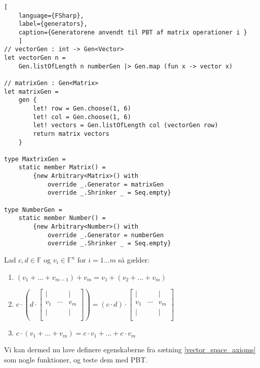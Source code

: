 \begin{lstlisting}[
    language={FSharp}, 
    label={generators}, 
    caption={Generatorene anvendt til PBT af matrix operationer i }
    ]
// vectorGen : int -> Gen<Vector>
let vectorGen n =
    Gen.listOfLength n numberGen |> Gen.map (fun x -> vector x)

// matrixGen : Gen<Matrix>
let matrixGen =
    gen {
        let! row = Gen.choose(1, 6)
        let! col = Gen.choose(1, 6)
        let! vectors = Gen.listOfLength col (vectorGen row)
        return matrix vectors
    }

type MaxtrixGen =
    static member Matrix() =
        {new Arbitrary<Matrix>() with
            override _.Generator = matrixGen
            override _.Shrinker _ = Seq.empty}

type NumberGen =
    static member Number() =
        {new Arbitrary<Number>() with
            override _.Generator = numberGen
            override _.Shrinker _ = Seq.empty}   
\end{lstlisting}
\begin{theorem}\label{vector_space_axioms}
    Lad $c, d \in \mathbb{F}$ og $v_i \in \mathbb{F}^n$ for $i = 1 \dots m$ så gælder:
    \begin{enumerate}
        \item $(v_1 + \dots + v_{m-1}) + v_m = v_1 + (v_2 + \dots + v_m)$
        \item $c \cdot \left(d \cdot \begin{bmatrix}
            | &        & | \\
            v_{1} & \cdots & v_{m} \\
            | &        & | \\
        \end{bmatrix}\right) = (c \cdot d) \cdot \begin{bmatrix}
            | &        & | \\
            v_{1} & \cdots & v_{m} \\
            | &        & | \\
        \end{bmatrix}$
        
        \item $c \cdot (v_1 + \dots +v_m) = c \cdot v_1 + \dots +c \cdot v_m$
    \end{enumerate}
\end{theorem}

Vi kan dermed nu lave definere egenskaberne fra sætning \ref{vector_space_axioms} som nogle funktioner, og teste dem med PBT.

